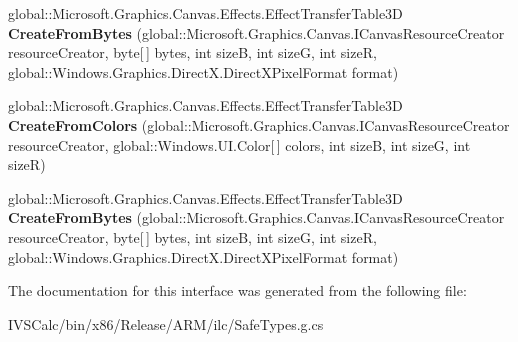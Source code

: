 \begin{DoxyCompactItemize}
\item 
\mbox{\label{interface_microsoft_1_1_graphics_1_1_canvas_1_1_effects_1_1_i_effect_transfer_table3_d_statics_ac1a661dd1e7abbf576d8ff78f4e17171}} 
global\+::\+Microsoft.\+Graphics.\+Canvas.\+Effects.\+Effect\+Transfer\+Table3D {\bfseries Create\+From\+Bytes} (global\+::\+Microsoft.\+Graphics.\+Canvas.\+I\+Canvas\+Resource\+Creator resource\+Creator, byte\mbox{[}$\,$\mbox{]} bytes, int sizeB, int sizeG, int sizeR, global\+::\+Windows.\+Graphics.\+Direct\+X.\+Direct\+X\+Pixel\+Format format)
\item 
\mbox{\label{interface_microsoft_1_1_graphics_1_1_canvas_1_1_effects_1_1_i_effect_transfer_table3_d_statics_ac91fd90ed33239f56927bf545d88da2a}} 
global\+::\+Microsoft.\+Graphics.\+Canvas.\+Effects.\+Effect\+Transfer\+Table3D {\bfseries Create\+From\+Colors} (global\+::\+Microsoft.\+Graphics.\+Canvas.\+I\+Canvas\+Resource\+Creator resource\+Creator, global\+::\+Windows.\+U\+I.\+Color\mbox{[}$\,$\mbox{]} colors, int sizeB, int sizeG, int sizeR)
\item 
\mbox{\label{interface_microsoft_1_1_graphics_1_1_canvas_1_1_effects_1_1_i_effect_transfer_table3_d_statics_ac1a661dd1e7abbf576d8ff78f4e17171}} 
global\+::\+Microsoft.\+Graphics.\+Canvas.\+Effects.\+Effect\+Transfer\+Table3D {\bfseries Create\+From\+Bytes} (global\+::\+Microsoft.\+Graphics.\+Canvas.\+I\+Canvas\+Resource\+Creator resource\+Creator, byte\mbox{[}$\,$\mbox{]} bytes, int sizeB, int sizeG, int sizeR, global\+::\+Windows.\+Graphics.\+Direct\+X.\+Direct\+X\+Pixel\+Format format)
\end{DoxyCompactItemize}


The documentation for this interface was generated from the following file\+:\begin{DoxyCompactItemize}
\item 
I\+V\+S\+Calc/bin/x86/\+Release/\+A\+R\+M/ilc/Safe\+Types.\+g.\+cs\end{DoxyCompactItemize}
